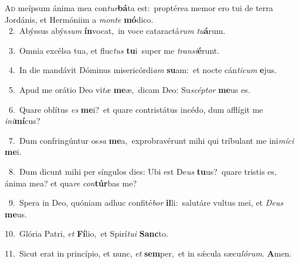 \lettrine{\initial\textcolor{\initialcolor}{A}}{d} meípsum ánima mea con\-\textit{tur}\-\textbf{bá}ta est:~\star proptérea memor ero tui de terra Jordánis, et Hermóniim a \textit{mon}\-\textit{te} \textbf{mó}\-dico.\\
{\numbfont\textcolor{\numbcolor}{~2.}}~Abýssus abýs\textit{sum} \textbf{ín}\-vocat,~\star in voce cataractá\textit{rum} \textit{tu}\-\textbf{á}rum.\par
{\numbfont\textcolor{\numbcolor}{~3.}}~Omnia excélsa tua, et fluc\textit{tus} \textbf{tu}\-i~\star super me \textit{trans}\-\textit{i}\textbf{é}runt.\par
{\numbfont\textcolor{\numbcolor}{~4.}}~In die mandávit Dóminus misericórdi\textit{am} \textbf{su}\-am:~\star et nocte cán\-\textit{ti}\-\textit{cum} \textbf{e}\-jus.\par
{\numbfont\textcolor{\numbcolor}{~5.}}~Apud me orátio Deo vi\textit{tæ} \textbf{me}\-æ,~\star dicam Deo: Su\-\textit{scép}\-\textit{tor} \textbf{me}\-us es.\par
{\numbfont\textcolor{\numbcolor}{~6.}}~Quare oblítus \textit{es} \textbf{me}\-i?~\star et quare contristátus incédo, dum afflígit me \textit{in}\-\textit{i}\textbf{mí}cus?\par
{\numbfont\textcolor{\numbcolor}{~7.}}~Dum confringúntur os\textit{sa} \textbf{me}\-a,~\star exprobravérunt mihi qui tríbulant me ini\-\textit{mí}\-\textit{ci} \textbf{me}\-i.\par
{\numbfont\textcolor{\numbcolor}{~8.}}~Dum dicunt mihi per síngulos dies: Ubi est De\textit{us} \textbf{tu}\-us?~\star quare tristis es, ánima mea? et qua\textit{re} \textit{con}\-\textbf{túr}bas me?\par
{\numbfont\textcolor{\numbcolor}{~9.}}~Spera in Deo, quóniam adhuc confité\textit{bor} \textbf{il}\-li:~\star salutáre vultus mei, et \textit{De}\-\textit{us} \textbf{me}\-us.\par
{\numbfont\textcolor{\numbcolor}{10.}}~Glória Patri, \textit{et} \textbf{Fí}\-lio,~\star et Spirí\-\textit{tu}\-\textit{i} \textbf{Sanc}\-to.\par
{\numbfont\textcolor{\numbcolor}{11.}}~Sicut erat in princípio, et nunc, \textit{et} \textbf{sem}\-per,~\star et in sǽcula sæcu\-\textit{ló}\-\textit{rum}. \textbf{A}\-men.\par
